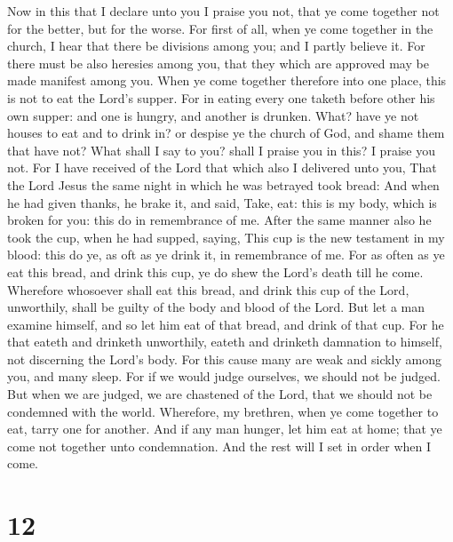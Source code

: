  Now in this that I declare unto you I praise you not,
that ye come together not for the better, but for the worse.
 For first of all, when ye come together in the church, I
hear that there be divisions among you; and I partly believe it.
 For there must be also heresies among you, that they
which are approved may be made manifest among you.  When
ye come together therefore into one place, this is not to eat the Lord's
supper.  For in eating every one taketh before other his
own supper: and one is hungry, and another is drunken. 
What? have ye not houses to eat and to drink in? or despise ye the
church of God, and shame them that have not? What shall I say to you?
shall I praise you in this? I praise you not.  For I have
received of the Lord that which also I delivered unto you, That the Lord
Jesus the same night in which he was betrayed took bread:
 And when he had given thanks, he brake it, and said,
Take, eat: this is my body, which is broken for you: this do in
remembrance of me.  After the same manner also he took
the cup, when he had supped, saying, This cup is the new testament in my
blood: this do ye, as oft as ye drink it, in remembrance of me.
 For as often as ye eat this bread, and drink this cup,
ye do shew the Lord's death till he come.  Wherefore
whosoever shall eat this bread, and drink this cup of the Lord,
unworthily, shall be guilty of the body and blood of the Lord.
 But let a man examine himself, and so let him eat of
that bread, and drink of that cup.  For he that eateth
and drinketh unworthily, eateth and drinketh damnation to himself, not
discerning the Lord's body.  For this cause many are weak
and sickly among you, and many sleep.  For if we would
judge ourselves, we should not be judged.  But when we
are judged, we are chastened of the Lord, that we should not be
condemned with the world.  Wherefore, my brethren, when
ye come together to eat, tarry one for another.  And if
any man hunger, let him eat at home; that ye come not together unto
condemnation. And the rest will I set in order when I come.

\hypertarget{section-11}{%
\section{12}\label{section-11}}

